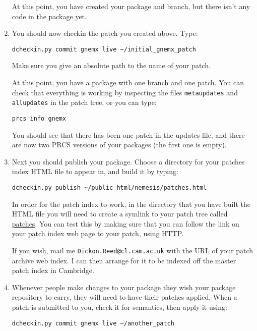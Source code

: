 \documentclass[a4paper]{article}
\newcommand{\file}[1]{\url{#1}}
\begin{document}
\begin{enumerate}
At this point, you have created your package and branch, but there
isn't any code in the package yet.

\item You should now checkin the patch you created above. Type:

\begin{verbatim}
dcheckin.py commit gnemx live ~/initial_gnemx_patch
\end{verbatim}

Make sure you give an absolute path to the name of your patch.

At this point, you have a package with one branch and one patch. You
can check that everything is working by inspecting the files
\texttt{metaupdates} and \texttt{allupdates} in the patch tree, or you
can type:

\begin{verbatim}
prcs info gnemx
\end{verbatim}

You should see that there has been one patch in the updates file, and
there are now two PRCS versions of your packages (the first one is
empty).

\item Next you should publish your package. Choose a directory for
your patches index HTML file to appear in, and build it by typing:

\begin{verbatim}
dcheckin.py publish ~/public_html/nemesis/patches.html
\end{verbatim}

In order for the patch index to work, in the directory that you have
built the HTML file you will need to create a symlink to your patch
tree called \file{patches}. You can test this by making sure that
you can follow the link on your patch index web page to your patch,
using HTTP.

If you wish, mail me \texttt{Dickon.Reed@cl.cam.ac.uk} with the
URL of your patch archive web index. I can then arrange for it to be
indexed off the master patch index in Cambridge.

\item Whenever people make changes to your package they wish your
package repository to carry, they will need to have their patches
applied. When a patch is submitted to you, check it for semantics,
then apply it using:

\begin{verbatim}
dcheckin.py commit gnemx live ~/another_patch
\end{verbatim}


\end{enumerate}
\end{document}
